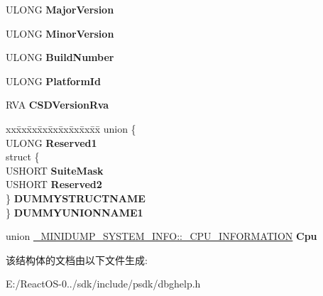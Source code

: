 \begin{DoxyCompactItemize}
\begin{tabbing}
\end{tabbing}\item 
\mbox{\label{struct___m_i_n_i_d_u_m_p___s_y_s_t_e_m___i_n_f_o_ad956eb08006376120a56acd1352d8881}} 
U\+L\+O\+NG {\bfseries Major\+Version}
\item 
\mbox{\label{struct___m_i_n_i_d_u_m_p___s_y_s_t_e_m___i_n_f_o_ad5cd8b7e1cc8a43e9a8f0f1ae9b9c668}} 
U\+L\+O\+NG {\bfseries Minor\+Version}
\item 
\mbox{\label{struct___m_i_n_i_d_u_m_p___s_y_s_t_e_m___i_n_f_o_a1f685aa5975fe8eed0a08838d723d0ec}} 
U\+L\+O\+NG {\bfseries Build\+Number}
\item 
\mbox{\label{struct___m_i_n_i_d_u_m_p___s_y_s_t_e_m___i_n_f_o_a4011c6345d0b77fea32e7867d54b9ada}} 
U\+L\+O\+NG {\bfseries Platform\+Id}
\item 
\mbox{\label{struct___m_i_n_i_d_u_m_p___s_y_s_t_e_m___i_n_f_o_a37705b7880d833ef2ad46a19e395c9f7}} 
R\+VA {\bfseries C\+S\+D\+Version\+Rva}
\item 
\mbox{\label{struct___m_i_n_i_d_u_m_p___s_y_s_t_e_m___i_n_f_o_a34c1b07214787c47de40f5f76e50cac7}} 
\begin{tabbing}
xx\=xx\=xx\=xx\=xx\=xx\=xx\=xx\=xx\=\kill
union \{\\
\>ULONG {\bfseries Reserved1}\\
\>struct \{\\
\>\>USHORT {\bfseries SuiteMask}\\
\>\>USHORT {\bfseries Reserved2}\\
\>\} {\bfseries DUMMYSTRUCTNAME}\\
\} {\bfseries DUMMYUNIONNAME1}\\

\end{tabbing}\item 
\mbox{\label{struct___m_i_n_i_d_u_m_p___s_y_s_t_e_m___i_n_f_o_a245bca897848a6783fac193a53f3ec23}} 
union \hyperlink{union___m_i_n_i_d_u_m_p___s_y_s_t_e_m___i_n_f_o_1_1___c_p_u___i_n_f_o_r_m_a_t_i_o_n}{\+\_\+\+M\+I\+N\+I\+D\+U\+M\+P\+\_\+\+S\+Y\+S\+T\+E\+M\+\_\+\+I\+N\+F\+O\+::\+\_\+\+C\+P\+U\+\_\+\+I\+N\+F\+O\+R\+M\+A\+T\+I\+ON} {\bfseries Cpu}
\end{DoxyCompactItemize}


该结构体的文档由以下文件生成\+:\begin{DoxyCompactItemize}
\item 
E\+:/\+React\+O\+S-\/0../sdk/include/psdk/dbghelp.\+h\end{DoxyCompactItemize}
